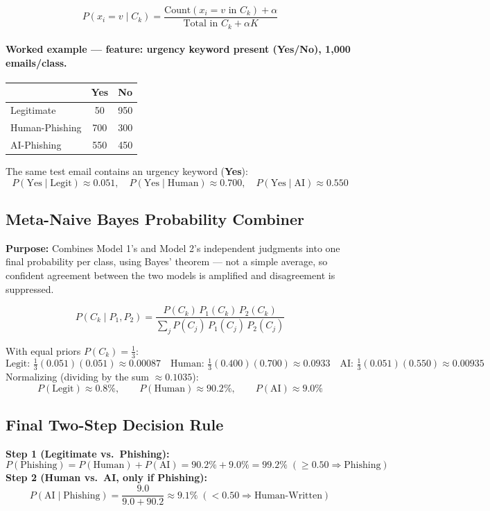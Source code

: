 \documentclass[11pt]{article}
\newcommand{\purpose}[1]{\par\noindent\textbf{Purpose:} #1\par}
\begin{document}
\[
P(x_i=v\mid C_k) = \frac{\text{Count}(x_i=v \text{ in } C_k)+\alpha}{\text{Total in } C_k+\alpha K}
\]

\paragraph{Worked example --- feature: urgency keyword present (Yes/No), 1{,}000 emails/class.}
\begin{center}
\begin{tabular}{lcc}
\toprule
 & Yes & No \\
\midrule
Legitimate & 50 & 950 \\
Human-Phishing & 700 & 300 \\
AI-Phishing & 550 & 450 \\
\bottomrule
\end{tabular}
\end{center}
The same test email contains an urgency keyword (\textbf{Yes}):
\[
P(\text{Yes}\mid\text{Legit})\approx0.051,\quad P(\text{Yes}\mid\text{Human})\approx0.700,\quad
P(\text{Yes}\mid\text{AI})\approx0.550
\]

\subsection{Meta-Naive Bayes Probability Combiner}
\purpose{Combines Model 1's and Model 2's independent judgments into one final probability per class,
using Bayes' theorem --- not a simple average, so confident agreement between the two models is
amplified and disagreement is suppressed.}

\[
P(C_k \mid P_1,P_2) = \frac{P(C_k)\,P_1(C_k)\,P_2(C_k)}{\sum_j P(C_j)\,P_1(C_j)\,P_2(C_j)}
\]

With equal priors $P(C_k)=\tfrac{1}{3}$:
\[
\text{Legit: } \tfrac{1}{3}(0.051)(0.051)\approx0.00087 \quad
\text{Human: } \tfrac{1}{3}(0.400)(0.700)\approx0.0933 \quad
\text{AI: } \tfrac{1}{3}(0.051)(0.550)\approx0.00935
\]
Normalizing (dividing by the sum $\approx0.1035$):
\[
P(\text{Legit})\approx0.8\%, \qquad P(\text{Human})\approx90.2\%, \qquad P(\text{AI})\approx9.0\%
\]

\subsection{Final Two-Step Decision Rule}
\textbf{Step 1 (Legitimate vs.\ Phishing):}
\[
P(\text{Phishing}) = P(\text{Human})+P(\text{AI}) = 90.2\%+9.0\% = 99.2\% \;(\geq 0.50 \Rightarrow \text{Phishing})
\]
\textbf{Step 2 (Human vs.\ AI, only if Phishing):}
\[
P(\text{AI}\mid\text{Phishing}) = \frac{9.0}{9.0+90.2} \approx 9.1\% \;(< 0.50 \Rightarrow \text{Human-Written})
\]
\end{document}
